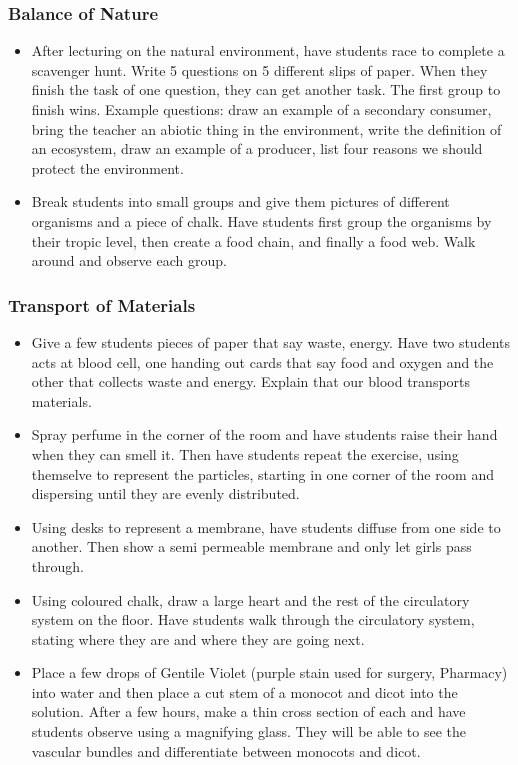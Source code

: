 \subsubsection{Balance of Nature}
\begin{itemize}
\item After lecturing on the natural environment, have students race to complete a scavenger hunt.  Write 5 questions on 5 different slips of paper.  When they finish the task of one question, they can get another task. The first group to finish wins. Example questions: draw an example of a secondary consumer, bring the teacher an  abiotic thing in the environment, write the definition of an ecosystem, draw an example of a producer, list four reasons we should protect the environment.
\item Break students into small groups and give them pictures of different organisms and a piece of chalk.  Have students first group the organisms by their tropic level, then create a food chain, and finally a food web.  Walk around and observe each group. 
\end{itemize}

\subsubsection{Transport of Materials}
\begin{itemize}
\item Give a few students pieces of paper that say waste, energy.  Have two students acts at blood cell, one handing out cards that say food and oxygen and the other that collects waste and energy.  Explain that our blood transports materials.
\item Spray perfume in the corner of the room and have students raise their hand when they can smell it.  Then have students repeat the exercise, using themselve to represent the particles, starting in one corner of the room and dispersing until they are evenly distributed.
\item Using desks to represent a membrane, have students diffuse from one side to another.  Then show a semi permeable membrane and only let girls pass through.
\item Using coloured chalk, draw a large heart and the rest of the circulatory system on the floor.  Have students walk through the circulatory system, stating where they are and where they are going next.
\item Place a few drops of Gentile Violet (purple stain used for surgery, Pharmacy) into water and then place a cut stem of a monocot and dicot into the solution.  After a few hours, make a thin cross section of each and have students observe using a magnifying glass.  They will be able to see the vascular bundles and differentiate between monocots and dicot. 
\end{itemize}

